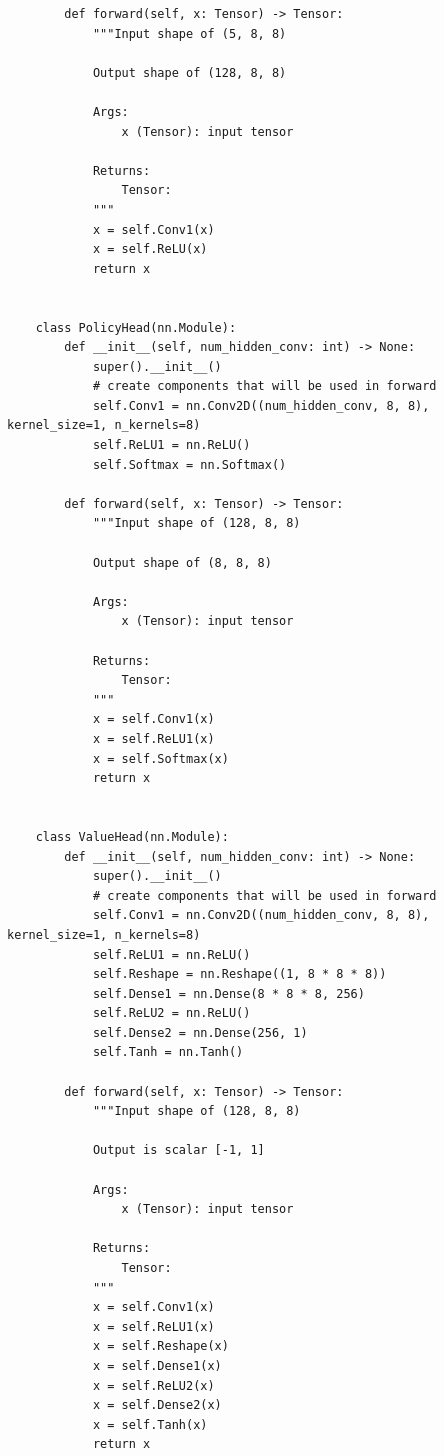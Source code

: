\documentclass{article}
\begin{document}
\begin{verbatim}
        def forward(self, x: Tensor) -> Tensor:
            """Input shape of (5, 8, 8)

            Output shape of (128, 8, 8)

            Args:
                x (Tensor): input tensor

            Returns:
                Tensor:
            """
            x = self.Conv1(x)
            x = self.ReLU(x)
            return x


    class PolicyHead(nn.Module):
        def __init__(self, num_hidden_conv: int) -> None:
            super().__init__()
            # create components that will be used in forward
            self.Conv1 = nn.Conv2D((num_hidden_conv, 8, 8), kernel_size=1, n_kernels=8)
            self.ReLU1 = nn.ReLU()
            self.Softmax = nn.Softmax()

        def forward(self, x: Tensor) -> Tensor:
            """Input shape of (128, 8, 8)

            Output shape of (8, 8, 8)

            Args:
                x (Tensor): input tensor

            Returns:
                Tensor:
            """
            x = self.Conv1(x)
            x = self.ReLU1(x)
            x = self.Softmax(x)
            return x


    class ValueHead(nn.Module):
        def __init__(self, num_hidden_conv: int) -> None:
            super().__init__()
            # create components that will be used in forward
            self.Conv1 = nn.Conv2D((num_hidden_conv, 8, 8), kernel_size=1, n_kernels=8)
            self.ReLU1 = nn.ReLU()
            self.Reshape = nn.Reshape((1, 8 * 8 * 8))
            self.Dense1 = nn.Dense(8 * 8 * 8, 256)
            self.ReLU2 = nn.ReLU()
            self.Dense2 = nn.Dense(256, 1)
            self.Tanh = nn.Tanh()

        def forward(self, x: Tensor) -> Tensor:
            """Input shape of (128, 8, 8)

            Output is scalar [-1, 1]

            Args:
                x (Tensor): input tensor

            Returns:
                Tensor:
            """
            x = self.Conv1(x)
            x = self.ReLU1(x)
            x = self.Reshape(x)
            x = self.Dense1(x)
            x = self.ReLU2(x)
            x = self.Dense2(x)
            x = self.Tanh(x)
            return x



\end{verbatim}
\end{document}
